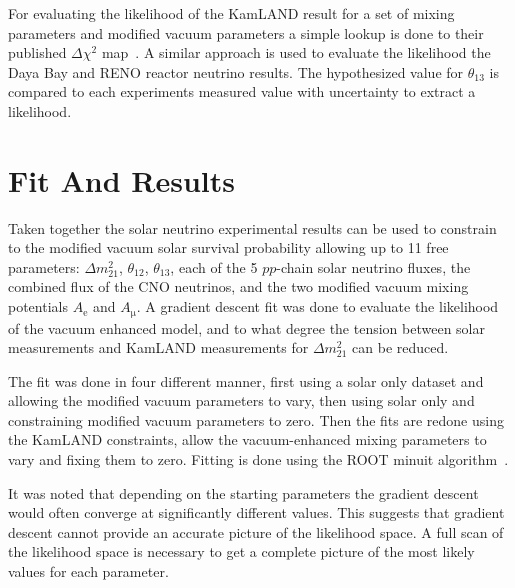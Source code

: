 For evaluating the likelihood of the KamLAND result for a set of
mixing parameters and modified vacuum parameters a simple lookup
is done to their published $\Delta \chi^{2}$ map~\cite{kamland_data_release}.
A similar approach is used to evaluate the likelihood the Daya Bay and
RENO reactor neutrino results. 
The hypothesized value for $\theta_{13}$ is compared to each
experiments measured value with uncertainty to extract a likelihood.


\chapter{Fit And Results}
\label{sec:cham_results}
Taken together the solar neutrino experimental results can be used to constrain
to the modified vacuum solar survival probability allowing up to
11 free parameters: $\Delta m^{2}_{21}$, $\theta_{12}$, $\theta_{13}$,
each of the 5 $pp$-chain solar neutrino fluxes, the combined flux of the
CNO neutrinos, and the two modified vacuum mixing potentials $A_{\mathrm{e}}$
and $A_{\mathrm{\mu}}$.
A gradient descent fit was done to evaluate the likelihood of the vacuum enhanced
model, and to what degree the tension between solar measurements and KamLAND measurements
for $\Delta m^{2}_{21}$ can be reduced.

The fit was done in four different manner,
first using a solar only dataset and allowing the modified vacuum parameters
to vary, then using solar only and constraining modified vacuum parameters
to zero.
Then the fits are redone using the KamLAND constraints, allow 
the vacuum-enhanced mixing parameters to vary and fixing them to zero.
Fitting is done using the ROOT minuit algorithm~\cite{minuit}.

It was noted that depending on the starting parameters the gradient
descent would often converge at significantly different values.
This suggests that gradient descent cannot provide an accurate
picture of the likelihood space.
A full scan of the likelihood space is necessary to
get a complete picture of the most likely values for
each parameter.

